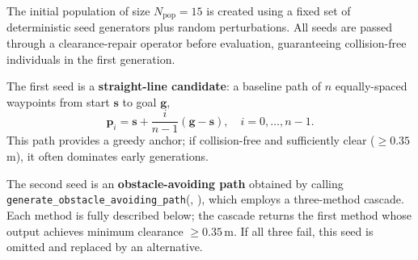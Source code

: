 \documentclass[lettersize,journal]{IEEEtran}
\begin{document}
The initial population of size $N_{\mathrm{pop}} = 15$ is created using a
fixed set of deterministic seed generators plus random perturbations. All seeds
are passed through a clearance-repair operator before evaluation, guaranteeing
collision-free individuals in the first generation.

The first seed is a \textbf{straight-line candidate}: a baseline path of $n$ 
equally-spaced waypoints from start $\mathbf{s}$ to goal $\mathbf{g}$,
\begin{equation}
  \mathbf{p}_i = \mathbf{s} + \frac{i}{n-1}(\mathbf{g}-\mathbf{s}),
  \quad i=0,\ldots,n-1.
  \label{eq:seed_straight}
\end{equation}
This path provides a greedy anchor; if collision-free and sufficiently clear
($\geq 0.35$\,m), it often dominates early generations.

The second seed is an \textbf{obstacle-avoiding path} obtained by calling 
\texttt{generate\_obstacle\_avoiding\_path}(, ), which 
employs a three-method cascade. Each method is fully described below; the 
cascade returns the first method whose output achieves minimum clearance 
$\geq 0.35$\,m. If all three fail, this seed is omitted and replaced by an 
alternative.
\end{document}
